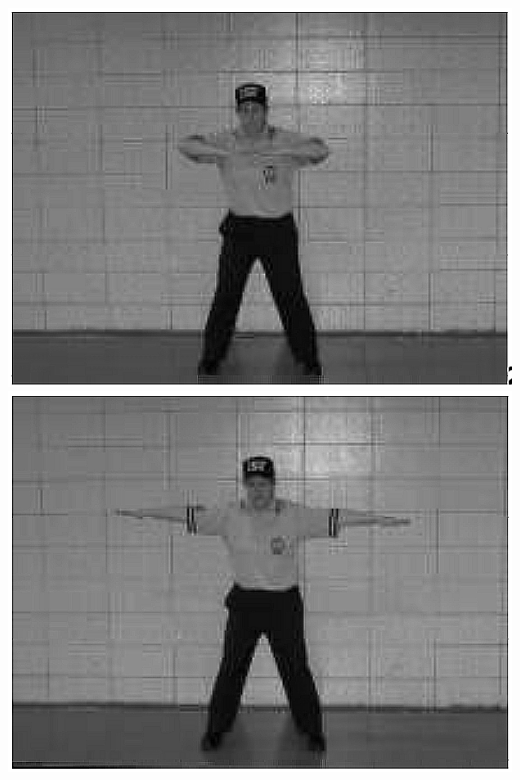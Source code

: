 \begin{enumerate}[label=(\alph*)]
	\includegraphics[height=.20\textheight]{fig/sinais/safe-1}
	\includegraphics[height=.20\textheight]{fig/sinais/safe-2}


\end{enumerate}
